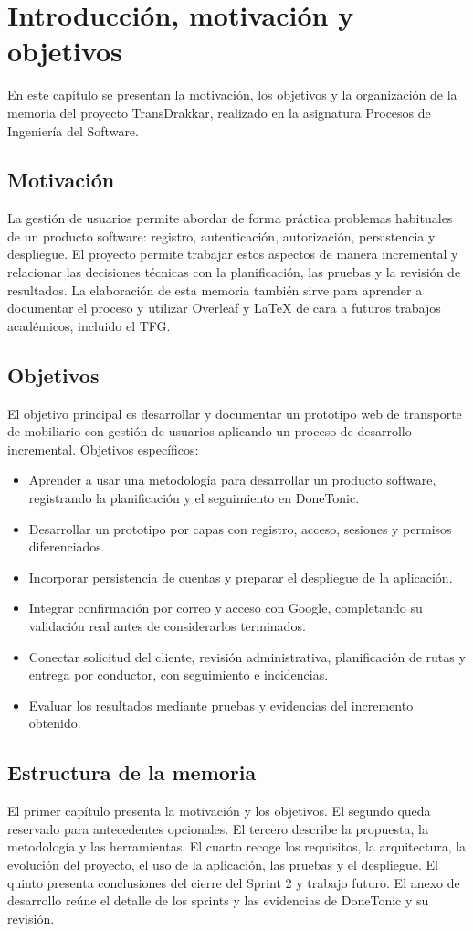 \chapter{Introducción, motivación y objetivos}
En este capítulo se presentan la motivación, los objetivos y la organización de la memoria del proyecto TransDrakkar, realizado en la asignatura Procesos de Ingeniería del Software.
\section{Motivación}
La gestión de usuarios permite abordar de forma práctica problemas habituales de un producto software: registro, autenticación, autorización, persistencia y despliegue. El proyecto permite trabajar estos aspectos de manera incremental y relacionar las decisiones técnicas con la planificación, las pruebas y la revisión de resultados.
La elaboración de esta memoria también sirve para aprender a documentar el proceso y utilizar Overleaf y LaTeX de cara a futuros trabajos académicos, incluido el TFG.
\section{Objetivos}
El objetivo principal es desarrollar y documentar un prototipo web de transporte de mobiliario con gestión de usuarios aplicando un proceso de desarrollo incremental.
Objetivos específicos:
\begin{itemize}
    \item Aprender a usar una metodología para desarrollar un producto software, registrando la planificación y el seguimiento en DoneTonic.
    \item Desarrollar un prototipo por capas con registro, acceso, sesiones y permisos diferenciados.
    \item Incorporar persistencia de cuentas y preparar el despliegue de la aplicación.
    \item Integrar confirmación por correo y acceso con Google, completando su validación real antes de considerarlos terminados.
    \item Conectar solicitud del cliente, revisión administrativa, planificación de rutas y entrega por conductor, con seguimiento e incidencias.
    \item Evaluar los resultados mediante pruebas y evidencias del incremento obtenido.
\end{itemize}
\section{Estructura de la memoria}
El primer capítulo presenta la motivación y los objetivos. El segundo queda reservado para antecedentes opcionales. El tercero describe la propuesta, la metodología y las herramientas. El cuarto recoge los requisitos, la arquitectura, la evolución del proyecto, el uso de la aplicación, las pruebas y el despliegue. El quinto presenta conclusiones del cierre del Sprint 2 y trabajo futuro. El anexo de desarrollo reúne el detalle de los sprints y las evidencias de DoneTonic y su revisión.
